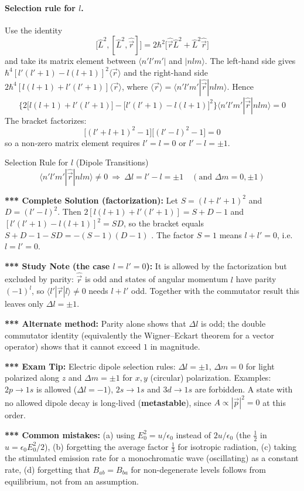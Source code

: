 \documentclass[11pt,a4paper]{article}
\begin{document}
\paragraph{Selection rule for $l$.} Use the identity
\[
\big[\hat L^2,[\hat L^2,\hat{\vec r}]\big]=2\hbar^2\big[\hat{\vec r}\hat L^2+\hat L^2\hat{\vec r}\big]
\]
and take its matrix element between $\langle n'l'm'|$ and $|nlm\rangle$. The left-hand side gives $\hbar^4[l'(l'+1)-l(l+1)]^2\langle\vec r\rangle$ and the right-hand side $2\hbar^4[l(l+1)+l'(l'+1)]\langle\vec r\rangle$, where $\langle\vec r\rangle=\langle n'l'm'|\hat{\vec r}|nlm\rangle$. Hence
\[
\Big\{2\big[l(l+1)+l'(l'+1)\big]-\big[l'(l'+1)-l(l+1)\big]^2\Big\}\langle n'l'm'|\hat{\vec r}|nlm\rangle=0
\]
The bracket factorizes:
\[
\big[(l'+l+1)^2-1\big]\big[(l'-l)^2-1\big]=0
\]
so a non-zero matrix element requires $l'=l=0$ or $l'-l=\pm1$.
\begin{thm}{Selection Rule for $l$ (Dipole Transitions)}
\[
\langle n'l'm'|\hat{\vec r}|nlm\rangle\neq0\ \Longrightarrow\ \Delta l=l'-l=\pm1\quad(\text{and }\Delta m=0,\pm1)
\]
\end{thm}

\textbf{*** Complete Solution (factorization):} Let $S=(l+l'+1)^2$ and $D=(l'-l)^2$. Then $2[l(l+1)+l'(l'+1)]=S+D-1$ and $[l'(l'+1)-l(l+1)]^2=SD$, so the bracket equals $S+D-1-SD=-(S-1)(D-1)$ \checkmark. The factor $S=1$ means $l+l'=0$, i.e.\ $l=l'=0$.

\textbf{*** Study Note (the case $l=l'=0$):} It is allowed by the factorization but excluded by parity: $\hat{\vec r}$ is odd and states of angular momentum $l$ have parity $(-1)^l$, so $\langle l'|\vec r|l\rangle\neq0$ needs $l+l'$ odd. Together with the commutator result this leaves only $\Delta l=\pm1$.

\textbf{*** Alternate method:} Parity alone shows that $\Delta l$ is odd; the double commutator identity (equivalently the Wigner--Eckart theorem for a vector operator) shows that it cannot exceed $1$ in magnitude.

\textbf{*** Exam Tip:} Electric dipole selection rules: $\Delta l=\pm1$, $\Delta m=0$ for light polarized along $z$ and $\Delta m=\pm1$ for $x,y$ (circular) polarization. Examples: $2p\to1s$ is allowed ($\Delta l=-1$), $2s\to1s$ and $3d\to1s$ are forbidden. A state with no allowed dipole decay is long-lived (\textbf{metastable}), since $A\propto|\vec p|^2=0$ at this order.

\textbf{*** Common mistakes:} (a) using $E_0^2=u/\epsilon_0$ instead of $2u/\epsilon_0$ (the $\frac12$ in $u=\epsilon_0E_0^2/2$), (b) forgetting the average factor $\frac13$ for isotropic radiation, (c) taking the stimulated emission rate for a monochromatic wave (oscillating) as a constant rate, (d) forgetting that $B_{ab}=B_{ba}$ for non-degenerate levels follows from equilibrium, not from an assumption.
\end{document}
